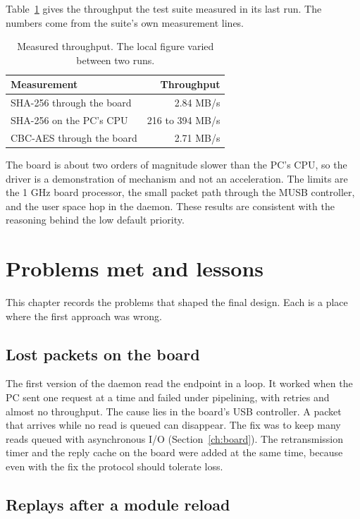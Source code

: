 \documentclass[11pt,a4paper,oneside]{report}
\begin{document}
Table~\ref{tab:perf} gives the throughput the test suite measured in its last run. The numbers come from the suite's own measurement lines.

\begin{table}[ht]
\centering
\begin{tabular}{lr}
\toprule
Measurement & Throughput \\
\midrule
SHA-256 through the board & 2.84 MB/s \\
SHA-256 on the PC's CPU & 216 to 394 MB/s \\
CBC-AES through the board & 2.71 MB/s \\
\bottomrule
\end{tabular}
\caption{Measured throughput. The local figure varied between two runs.}\label{tab:perf}
\end{table}

The board is about two orders of magnitude slower than the PC's CPU, so the driver is a demonstration of mechanism and not an acceleration. The limits are the 1 GHz board processor, the small packet path through the MUSB controller, and the user space hop in the daemon. These results are consistent with the reasoning behind the low default priority.



\chapter{Problems met and lessons}\label{ch:lessons}

This chapter records the problems that shaped the final design. Each is a place where the first approach was wrong.

\section{Lost packets on the board}

The first version of the daemon read the endpoint in a loop. It worked when the PC sent one request at a time and failed under pipelining, with retries and almost no throughput. The cause lies in the board's USB controller. A packet that arrives while no read is queued can disappear. The fix was to keep many reads queued with asynchronous I/O (Section~\ref{ch:board}). The retransmission timer and the reply cache on the board were added at the same time, because even with the fix the protocol should tolerate loss.

\section{Replays after a module reload}
\end{document}
